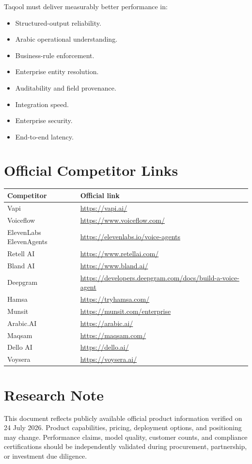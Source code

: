 \documentclass[10.5pt,a4paper]{article}
\newcommand{\BrandName}{Taqool}
\newcommand{\VerificationDate}{24 July 2026}
\begin{document}
\BrandName{} must deliver measurably better performance in:

\begin{itemize}
  \item Structured-output reliability.
  \item Arabic operational understanding.
  \item Business-rule enforcement.
  \item Enterprise entity resolution.
  \item Auditability and field provenance.
  \item Integration speed.
  \item Enterprise security.
  \item End-to-end latency.
\end{itemize}

\section{Official Competitor Links}

\begin{tabularx}{\textwidth}{L{42mm}Y}
\toprule
\textbf{Competitor} & \textbf{Official link} \\
\midrule
Vapi & \url{https://vapi.ai/} \\
Voiceflow & \url{https://www.voiceflow.com/} \\
ElevenLabs ElevenAgents & \url{https://elevenlabs.io/voice-agents} \\
Retell AI & \url{https://www.retellai.com/} \\
Bland AI & \url{https://www.bland.ai/} \\
Deepgram & \url{https://developers.deepgram.com/docs/build-a-voice-agent} \\
Hamsa & \url{https://tryhamsa.com/} \\
Munsit & \url{https://munsit.com/enterprise} \\
Arabic.AI & \url{https://arabic.ai/} \\
Maqsam & \url{https://maqsam.com/} \\
Dello AI & \url{https://dello.ai/} \\
Voysera & \url{https://voysera.ai/} \\
\bottomrule
\end{tabularx}

\section*{Research Note}

This document reflects publicly available official product information
verified on \VerificationDate. Product capabilities, pricing, deployment
options, and positioning may change. Performance claims, model quality,
customer counts, and compliance certifications should be independently
validated during procurement, partnership, or investment due diligence.
\end{document}
